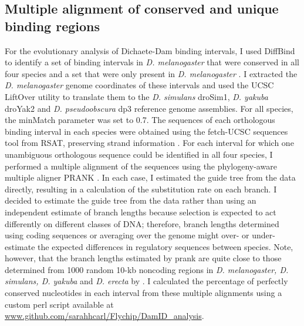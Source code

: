 \subsection{Multiple alignment of conserved and unique binding regions}
For the evolutionary analysis of Dichaete-Dam binding intervals, I used DiffBind to identify a set of binding intervals in \emph{D. melanogaster} that were conserved in all four species and a set that were only present in \emph{D. melanogaster} \citep{ross-innes_differential_2012}. I extracted the \emph{D. melanogaster} genome coordinates of these intervals and used the UCSC LiftOver utility to translate them to the \emph{D. simulans} droSim1, \emph{D. yakuba} droYak2 and \emph{D. pseudoobscura} dp3 reference genome assemblies. For all species, the minMatch parameter was set to 0.7. The sequences of each orthologous binding interval in each species were obtained using the fetch-UCSC sequences tool from RSAT, preserving strand information \citep{thomas-chollier_rsat_2011}. For each interval for which one unambiguous orthologous sequence could be identified in all four species, I performed a multiple alignment of the sequences using the phylogeny-aware multiple aligner PRANK \citep{loytynoja_algorithm_2005,loytynoja_phylogeny-aware_2008}. In each case, I estimated the guide tree from the data directly, resulting in a calculation of the substitution rate on each branch. I decided to estimate the guide tree from the data rather than using an independent estimate of branch lengths because selection is expected to act differently on different classes of DNA; therefore, branch lengths determined using coding sequences or averaging over the genome might over- or under-estimate the expected differences in regulatory sequences between species. Note, however, that the branch lengths estimated by prank are quite close to those determined from 1000 random 10-kb noncoding regions in \emph{D. melanogaster, D. simulans, D. yakuba} and \emph{D. erecta} by \citet{moses_large-scale_2006}. I calculated the percentage of perfectly conserved nucleotides in each interval from these multiple alignments using a custom perl script available at \url{www.github.com/sarahhcarl/Flychip/DamID_analysis}.

